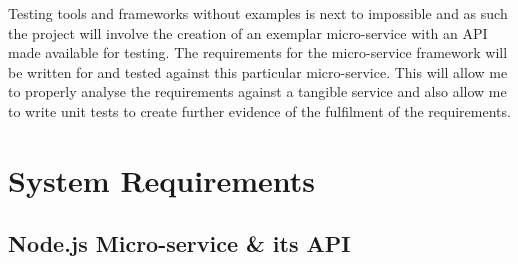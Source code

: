 Testing tools and frameworks without examples is next to impossible and as such the project will involve the creation of an exemplar micro-service with an API made available for testing. The requirements for the micro-service framework will be written for and tested against this particular micro-service. This will allow me to properly analyse the requirements against a tangible service and also allow me to write unit tests to create further evidence of the fulfilment of the requirements.

\section{System Requirements}

\subsection{Node.js Micro-service \& its API}
